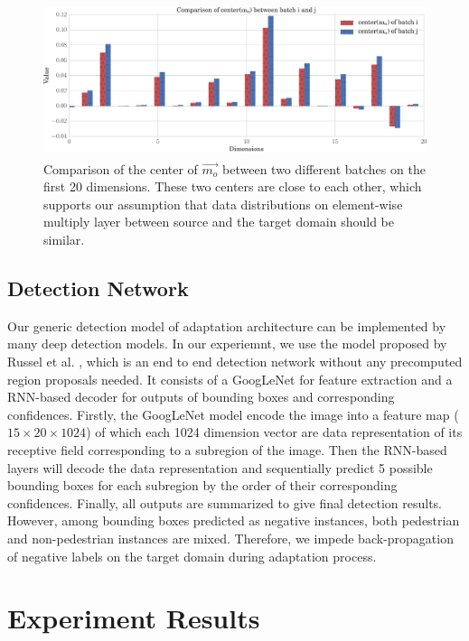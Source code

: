 \documentclass[runningheads]{llncs}
\begin{document}
\begin{figure}
\centering
\includegraphics[height=4.5cm]{images/mmd2.pdf}
\caption{Comparison of the center of $\vec{m_{o}}$ between two different batches on the first 20 dimensions. These two centers are close to each other, which supports our assumption that data distributions on element-wise multiply layer between source and the target domain should be similar.  }
\label{fig:mmd2}
\end{figure}



\subsection{Detection Network}
\label{section:Detection Network}
Our generic detection model of adaptation architecture can be implemented by many deep detection models. In our experiemnt, we use the model proposed by Russel et al. \cite{stewart2015end}, which is an end to end detection network without any precomputed region proposals needed. It consists of a GoogLeNet \cite{szegedy2015going} for feature extraction and a RNN-based decoder for outputs of bounding boxes and corresponding confidences. Firstly, the GoogLeNet model encode the image into a feature map ($15\times20\times1024$) of which each 1024 dimension vector are data representation of its receptive field corresponding to a subregion of the image. Then the RNN-based layers will decode the data representation and sequentially predict 5 possible bounding boxes for each subregion by the order of their corresponding confidences. Finally, all outputs are summarized to give final detection results. However, among bounding boxes predicted as negative instances, both pedestrian and non-pedestrian instances are mixed. Therefore, we impede back-propagation of negative labels on the target domain during adaptation process.



\section{Experiment Results}
\label{section:Experiment Results}
\end{document}
